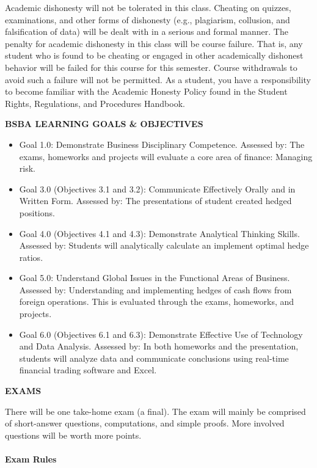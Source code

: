 \documentclass[11pt]{article}
\begin{document}
Academic dishonesty will not be tolerated in this class. Cheating
on quizzes, examinations, and other forms of dishonesty (e.g., plagiarism, collusion, and
falsification of data) will be dealt with in a serious and formal manner. The penalty for academic
dishonesty in this class will be course failure. That is, any student who is found to be cheating
or engaged in other academically dishonest behavior will be failed for this course for this
semester. Course withdrawals to avoid such a failure will not be permitted. As a student, you
have a responsibility to become familiar with the Academic Honesty Policy found in the Student
Rights, Regulations, and Procedures Handbook.\\
\begin{center}
\textbf{BSBA LEARNING GOALS \& OBJECTIVES}
\end{center}
\begin{itemize}
\item Goal 1.0: Demonstrate Business Disciplinary Competence.  Assessed by: The exams, homeworks and projects will evaluate a core area of finance: Managing risk.
\item Goal 3.0 (Objectives 3.1 and 3.2):  Communicate Effectively Orally and in Written Form.  Assessed by: The presentations of student created hedged positions.
\item Goal 4.0 (Objectives 4.1 and 4.3): Demonstrate Analytical Thinking Skills.  Assessed by: Students will analytically calculate an implement optimal hedge ratios.
\item Goal 5.0: Understand Global Issues in the Functional Areas of Business.  Assessed by: Understanding and implementing hedges of cash flows from foreign operations. This is evaluated through the exams, homeworks, and projects.
\item Goal 6.0 (Objectives 6.1 and 6.3):  Demonstrate Effective Use of Technology and Data Analysis.  Assessed by: In both homeworks and the presentation, students will analyze data and communicate conclusions using real-time financial trading software and Excel. 
\end{itemize}
\begin{center}
\textbf{EXAMS}
\end{center}
There will be one take-home exam (a final). The exam will mainly be comprised of short-answer questions, computations, and simple proofs.  More involved questions will be worth more points.  \\
\\
\textbf{Exam Rules}\\
\end{document}
